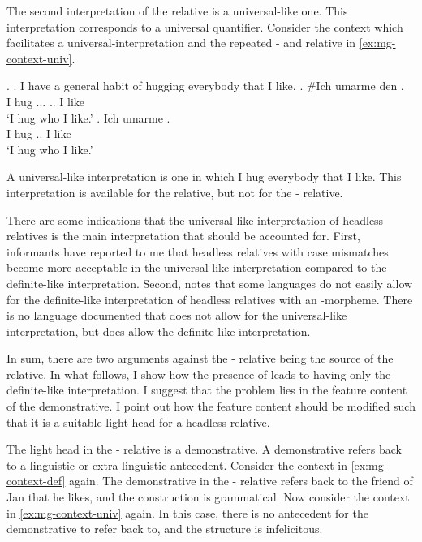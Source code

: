The second interpretation of the  relative is a universal-like one. This interpretation corresponds to a universal quantifier. Consider the context which facilitates a universal-interpretation and the repeated - and  relative in \ref{ex:mg-context-univ}.

\ex.
\a. I have a general habit of hugging everybody that I like.\label{ex:mg-context-univ}
\bg. \#Ich umarme den   .\\
I hug ... .. I like\\
`I hug who I like.'
\bg. Ich umarme   .\\
I hug .. I like\\
`I hug who I like.'

A universal-like interpretation is one in which I hug everybody that I like.
This interpretation is available for the  relative, but not for the - relative.

There are some indications that the universal-like interpretation of headless relatives is the main interpretation that should be accounted for.
First, informants have reported to me that headless relatives with case mismatches become more acceptable in the universal-like interpretation compared to the definite-like interpretation.
Second,  notes that some languages do not easily allow for the definite-like interpretation of headless relatives with an -morpheme. There is no language documented that does not allow for the universal-like interpretation, but does allow the definite-like interpretation.

In sum, there are two arguments against the - relative being the source of the  relative. In what follows, I show how the presence of  leads to having only the definite-like interpretation. I suggest that the problem lies in the feature content of the demonstrative. I point out how the feature content should be modified such that it is a suitable light head for a headless relative.

The light head in the - relative is a demonstrative. A demonstrative refers back to a linguistic or extra-linguistic antecedent. Consider the context in \ref{ex:mg-context-def} again. The demonstrative  in the - relative refers back to the friend of Jan that he likes, and the construction is grammatical. Now consider the context in \ref{ex:mg-context-univ} again. In this case, there is no antecedent for the demonstrative  to refer back to, and the structure is infelicitous.

